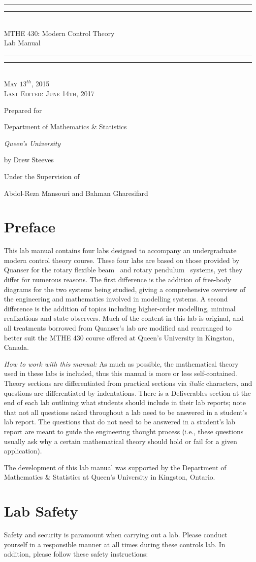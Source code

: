 \documentclass[12pt]{report}
\newcommand\drew[1]{\textcolor{red}{#1}}
\newcommand*{\titleGP}{\begingroup %
\centering %
\vspace*{\baselineskip} %

\rule{\textwidth}{1.6pt}\vspace*{-\baselineskip}\vspace*{2pt} %
\rule{\textwidth}{0.4pt}\\[\baselineskip] %

{\LARGE MTHE 430: Modern Control Theory\\ \vspace{2mm} Lab Manual}\\[0.2\baselineskip] %

\rule{\textwidth}{0.4pt}\vspace*{-\baselineskip}\vspace{3.2pt} %
\rule{\textwidth}{1.6pt}\\[\baselineskip] %

\scshape %
May $13^{th}$, 2015 \\
Last Edited:  June 14th, 2017\par %

\vspace*{6\baselineskip} %

Prepared for \\[\baselineskip]
{\Large Department of Mathematics \& Statistics\par}
{\itshape Queen's University\par}

\vspace{4mm}
by Drew Steeves

\vspace{8mm}
Under the Supervision of

\vspace{1mm}
Abdol-Reza Mansouri and Bahman Gharesifard


\vfill

\endgroup}
\begin{document}
\titleGP
\thispagestyle{empty}
\newpage
\tableofcontents
\newpage

\section{Preface} \label{section:preface}
This lab manual contains four labs designed to accompany an undergraduate modern control theory course. These four labs are based on those provided by Quanser for the rotary flexible beam~\cite{Q-Flex-Beam} and rotary pendulum~\cite{Q-Rot-Pen} systems, yet they differ for numerous reasons. The first difference is the addition of free-body diagrams for the two systems being studied, giving a comprehensive overview of the engineering and mathematics involved in modelling systems. A second difference is the addition of topics including higher-order modelling, minimal realizations and state observers. Much of the content in this lab is original, and all treatments borrowed from Quanser's lab are modified and rearranged to better suit the MTHE 430 course offered at Queen's University in Kingston, Canada.

\emph{How to work with this manual:} As much as possible, the mathematical theory used in these labs is included, thus this manual is more or less self-contained. Theory sections are differentiated from practical sections via \emph{italic} characters, and questions are differentiated by indentations. There is a Deliverables section at the end of each lab outlining what students should include in their lab reports; note that not all questions asked throughout a lab need to be answered in a student's lab report. The questions that do not need to be answered in a student's lab report are meant to guide the engineering thought process (i.e., these questions usually ask why a certain mathematical theory should hold or fail for a given application).

The development of this lab manual was supported by the Department of Mathematics \& Statistics at Queen's University in Kingston, Ontario.

\newpage
\section{Lab Safety} \label{section:safety}
Safety and security is paramount when carrying out a lab. Please conduct yourself in a responsible manner at all times during these controls lab. In addition, please follow these safety instructions:
\end{document}
